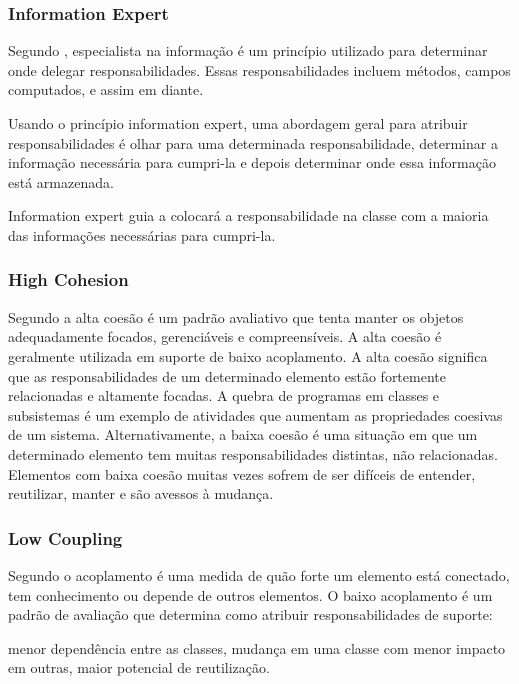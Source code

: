 \documentclass[12pt]{article}
\begin{document}
\subsubsection{Information Expert} \label{sec:grasp}
	
Segundo \cite{CRAIG_LARMAN}, especialista na informação é um princípio utilizado para determinar onde delegar responsabilidades. Essas responsabilidades incluem métodos, campos computados, e assim em diante.

Usando o princípio information expert, uma abordagem geral para atribuir responsabilidades é olhar para uma determinada responsabilidade, determinar a informação necessária para cumpri-la e depois determinar onde essa informação está armazenada.

Information expert guia a colocará a responsabilidade na classe com a maioria das informações necessárias para cumpri-la.

\subsubsection{High Cohesion} \label{sec:grasp}

Segundo \cite{CRAIG_LARMAN} a alta coesão é um padrão avaliativo que tenta manter os objetos adequadamente focados, gerenciáveis e compreensíveis. A alta coesão é geralmente utilizada em suporte de baixo acoplamento. A alta coesão significa que as responsabilidades de um determinado elemento estão fortemente relacionadas e altamente focadas. A quebra de programas em classes e subsistemas é um exemplo de atividades que aumentam as propriedades coesivas de um sistema. Alternativamente, a baixa coesão é uma situação em que um determinado elemento tem muitas responsabilidades distintas, não relacionadas. Elementos com baixa coesão muitas vezes sofrem de ser difíceis de entender, reutilizar, manter e são avessos à mudança.

\subsubsection{Low Coupling} \label{sec:grasp}

Segundo \cite{CRAIG_LARMAN} o acoplamento é uma medida de quão forte um elemento está conectado, tem conhecimento ou depende de outros elementos. O baixo acoplamento é um padrão de avaliação que determina como atribuir responsabilidades de suporte:

menor dependência entre as classes,
mudança em uma classe com menor impacto em outras,
maior potencial de reutilização.
\end{document}
